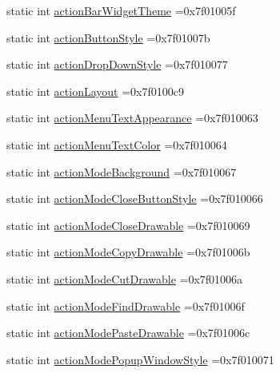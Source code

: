 \begin{DoxyCompactItemize}
\item 
static int \hyperlink{classandroid_1_1support_1_1v4_1_1R_1_1attr_ae29f1c530c505df758e34b5892c7ccd1}{action\+Bar\+Widget\+Theme} =0x7f01005f
\item 
static int \hyperlink{classandroid_1_1support_1_1v4_1_1R_1_1attr_a949bd6a877fac5b545925783cb5acff2}{action\+Button\+Style} =0x7f01007b
\item 
static int \hyperlink{classandroid_1_1support_1_1v4_1_1R_1_1attr_ae799f8ef42f49ca4ab5fde37b9c1d639}{action\+Drop\+Down\+Style} =0x7f010077
\item 
static int \hyperlink{classandroid_1_1support_1_1v4_1_1R_1_1attr_aaa9aa593650ce0ecbacb2754922c8a77}{action\+Layout} =0x7f0100c9
\item 
static int \hyperlink{classandroid_1_1support_1_1v4_1_1R_1_1attr_a12413683f25fb0956f8a2693d7105b3b}{action\+Menu\+Text\+Appearance} =0x7f010063
\item 
static int \hyperlink{classandroid_1_1support_1_1v4_1_1R_1_1attr_adaa3e9913be4b47636888a613fcaf800}{action\+Menu\+Text\+Color} =0x7f010064
\item 
static int \hyperlink{classandroid_1_1support_1_1v4_1_1R_1_1attr_ac4c7f5acc692e04adae25d9567546265}{action\+Mode\+Background} =0x7f010067
\item 
static int \hyperlink{classandroid_1_1support_1_1v4_1_1R_1_1attr_af028384bcaaf01be4eb4a6a14490f887}{action\+Mode\+Close\+Button\+Style} =0x7f010066
\item 
static int \hyperlink{classandroid_1_1support_1_1v4_1_1R_1_1attr_ad3242ecccbfe30007483999e176047de}{action\+Mode\+Close\+Drawable} =0x7f010069
\item 
static int \hyperlink{classandroid_1_1support_1_1v4_1_1R_1_1attr_af82835da89e3dbfb288ee7fd390bcb60}{action\+Mode\+Copy\+Drawable} =0x7f01006b
\item 
static int \hyperlink{classandroid_1_1support_1_1v4_1_1R_1_1attr_a153c359f53156ef6f6c8cbdae115e970}{action\+Mode\+Cut\+Drawable} =0x7f01006a
\item 
static int \hyperlink{classandroid_1_1support_1_1v4_1_1R_1_1attr_a63d2cf699ee588f2dd1e167ad656db83}{action\+Mode\+Find\+Drawable} =0x7f01006f
\item 
static int \hyperlink{classandroid_1_1support_1_1v4_1_1R_1_1attr_a6b7c3e96ea6bb4c2290019bafb9a4aa2}{action\+Mode\+Paste\+Drawable} =0x7f01006c
\item 
static int \hyperlink{classandroid_1_1support_1_1v4_1_1R_1_1attr_a2d18ec285a2e3e5cd9722429901f2d83}{action\+Mode\+Popup\+Window\+Style} =0x7f010071

\end{DoxyCompactItemize}

